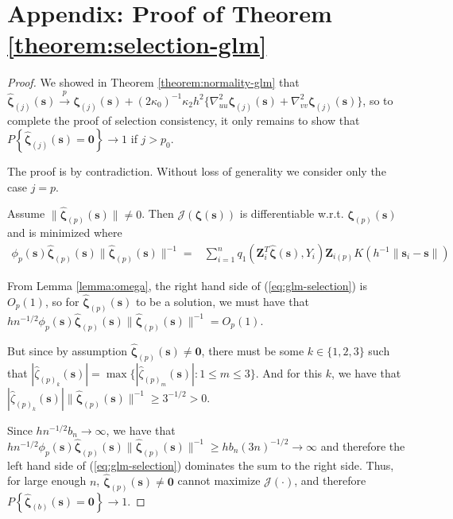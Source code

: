 \documentclass[authoryear,review, 12pt]{elsarticle}
\begin{document}
\section*{Appendix: Proof of Theorem \ref{theorem:selection-glm}}
\begin{proof}
We showed in Theorem \ref{theorem:normality-glm} that $\hat{\bm{\zeta}}_{(j)}(\bm{s})\xrightarrow{p}\bm{\zeta}_{(j)}(\bm{s})+\left(2\kappa_{0}\right)^{-1}\kappa_{2}h^{2}\{\nabla_{uu}^{2}\bm{\zeta}_{(j)}(\bm{s})+\nabla_{vv}^{2}\bm{\zeta}_{(j)}(\bm{s})\}$,
so to complete the proof of selection consistency, it only remains
to show that $P\left\{ \hat{\bm{\zeta}}_{(j)}(\bm{s})=\bm{0}\right\} \to1$
if $j>p_{0}$.

The proof is by contradiction. Without loss of generality we consider
only the case $j=p$.

Assume $\|\hat{\bm{\zeta}}_{(p)}(\bm{s})\|\ne0$. Then $\mathcal{J}\left(\bm{\zeta}(\bm{s})\right)$
is differentiable w.r.t. $\bm{\zeta}_{(p)}(\bm{s})$ and is minimized
where 
\begin{align}
\phi_{p}(\bm{s})\hat{\bm{\zeta}}_{(p)}(\bm{s})\|\hat{\bm{\zeta}}_{(p)}(\bm{s})\|^{-1}= & \sum_{i=1}^{n}q_{1}\!\left(\bm{Z}_{i}^{T}\hat{\bm{\zeta}}(\bm{s}),Y_{i}\right)\bm{Z}_{i(p)}K\left(h^{-1}\|\bm{s}_{i}-\bm{s}\|\right)\label{eq:glm-selection}
\end{align}


From Lemma \ref{lemma:omega}, the right hand side of (\ref{eq:glm-selection})
is $O_{p}\left(1\right)$, so for $\hat{\bm{\zeta}}_{(p)}(\bm{s})$
to be a solution, we must have that $hn^{-1/2}\phi_{p}(\bm{s})\hat{\bm{\zeta}}_{(p)}(\bm{s})\|\hat{\bm{\zeta}}_{(p)}(\bm{s})\|^{-1}=O_{p}\left(1\right)$.

But since by assumption $\hat{\bm{\zeta}}_{(p)}(\bm{s})\ne\bm{0}$,
there must be some $k\in\{1,2,3\}$ such that $|\hat{\zeta}_{(p)_{k}}(\bm{s})|=\max\{|\hat{\zeta}_{(p)_{m}}(\bm{s})|:1\le m\le3\}$.
And for this $k$, we have that $|\hat{\zeta}_{(p)_{k}}(\bm{s})|\|\hat{\bm{\zeta}}_{(p)}(\bm{s})\|^{-1}\ge3^{-1/2}>0$.

Since $hn^{-1/2}b_{n}\to\infty$, we have that $hn^{-1/2}\phi_{p}(\bm{s})\hat{\bm{\zeta}}_{(p)}(\bm{s})\|\hat{\bm{\zeta}}_{(p)}(\bm{s})\|^{-1}\ge hb_{n}(3n)^{-1/2}\to\infty$
and therefore the left hand side of (\ref{eq:glm-selection}) dominates
the sum to the right side. Thus, for large enough $n$, $\hat{\bm{\zeta}}_{(p)}(\bm{s})\ne\bm{0}$
cannot maximize $\mathcal{J}\left(\cdot\right)$, and therefore $P\left\{ \hat{\bm{\zeta}}_{(b)}(\bm{s})=\bm{0}\right\} \to1$. 
\end{proof}
\end{document}
